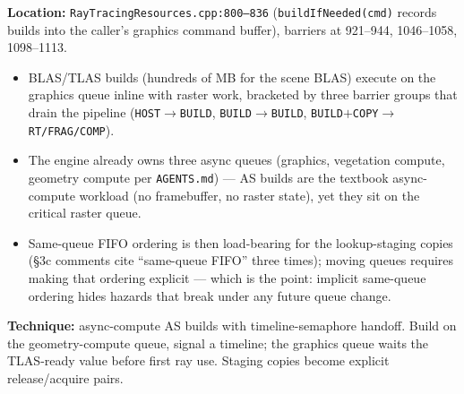 \documentclass[11pt,a4paper]{article}
\begin{document}
\textbf{Location:} \texttt{RayTracingResources.cpp:800--836} (\texttt{buildIfNeeded(cmd)} records builds into the caller's graphics command buffer), barriers at 921--944, 1046--1058, 1098--1113.

\begin{itemize}
    \item BLAS/TLAS builds (hundreds of MB for the scene BLAS) execute on the graphics queue inline with raster work, bracketed by three barrier groups that drain the pipeline (\texttt{HOST}$\rightarrow$\texttt{BUILD}, \texttt{BUILD}$\rightarrow$\texttt{BUILD}, \texttt{BUILD}$+$\texttt{COPY}$\rightarrow$\texttt{RT/FRAG/COMP}).
    \item The engine already owns three async queues (graphics, vegetation compute, geometry compute per \texttt{AGENTS.md}) --- AS builds are the textbook async-compute workload (no framebuffer, no raster state), yet they sit on the critical raster queue.
    \item Same-queue FIFO ordering is then load-bearing for the lookup-staging copies (\S3c comments cite ``same-queue FIFO'' three times); moving queues requires making that ordering explicit --- which is the point: implicit same-queue ordering hides hazards that break under any future queue change.
\end{itemize}

\textbf{Technique:} async-compute AS builds with timeline-semaphore handoff. Build on the geometry-compute queue, signal a timeline; the graphics queue waits the TLAS-ready value before first ray use. Staging copies become explicit release/acquire pairs.
\end{document}
